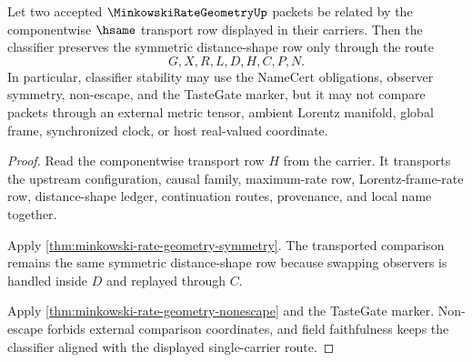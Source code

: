 \begin{theorem}
\label{thm:minkowski-rate-geometry-classifier-stability}
Let two accepted $\MinkowskiRateGeometryUp$ packets be related by the componentwise $\hsame$ transport row displayed in their carriers. Then the classifier preserves the symmetric distance-shape row only through the route
$$
G,X,R,L,D,H,C,P,N.
$$
In particular, classifier stability may use the NameCert obligations, observer symmetry, non-escape, and the TasteGate marker, but it may not compare packets through an external metric tensor, ambient Lorentz manifold, global frame, synchronized clock, or host real-valued coordinate.
\end{theorem}
\begin{proof}
Read the componentwise transport row $H$ from the carrier. It transports the upstream configuration, causal family, maximum-rate row, Lorentz-frame-rate row, distance-shape ledger, continuation routes, provenance, and local name together.

Apply \autoref{thm:minkowski-rate-geometry-symmetry}. The transported comparison remains the same symmetric distance-shape row because swapping observers is handled inside $D$ and replayed through $C$.

Apply \autoref{thm:minkowski-rate-geometry-nonescape} and the TasteGate marker. Non-escape forbids external comparison coordinates, and field faithfulness keeps the classifier aligned with the displayed single-carrier route.
\end{proof}

